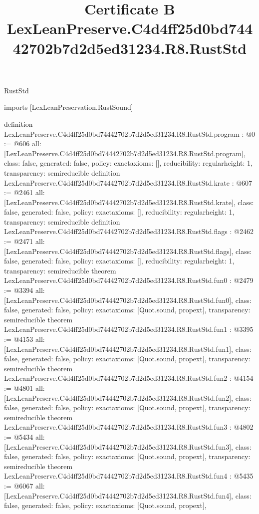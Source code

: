 \begin{lexlean}{RustStd}
\title{Certificate B LexLeanPreserve.C4d4ff25d0bd74442702b7d2d5ed31234.R8.RustStd}
\begin{coremodule}
imports [LexLeanPreservation.RustSound]

definition LexLeanPreserve.C4d4ff25d0bd74442702b7d2d5ed31234.R8.RustStd.program : @0 := @606 {
  all: [LexLeanPreserve.C4d4ff25d0bd74442702b7d2d5ed31234.R8.RustStd.program],
  class: false,
  generated: false,
  policy: exact{axioms: []},
  reducibility: regular{height: 1},
  transparency: semireducible
}
definition LexLeanPreserve.C4d4ff25d0bd74442702b7d2d5ed31234.R8.RustStd.krate : @607 := @2461 {
  all: [LexLeanPreserve.C4d4ff25d0bd74442702b7d2d5ed31234.R8.RustStd.krate],
  class: false,
  generated: false,
  policy: exact{axioms: []},
  reducibility: regular{height: 1},
  transparency: semireducible
}
definition LexLeanPreserve.C4d4ff25d0bd74442702b7d2d5ed31234.R8.RustStd.flags : @2462 := @2471 {
  all: [LexLeanPreserve.C4d4ff25d0bd74442702b7d2d5ed31234.R8.RustStd.flags],
  class: false,
  generated: false,
  policy: exact{axioms: []},
  reducibility: regular{height: 1},
  transparency: semireducible
}
theorem LexLeanPreserve.C4d4ff25d0bd74442702b7d2d5ed31234.R8.RustStd.fun0 : @2479 := @3394 {
  all: [LexLeanPreserve.C4d4ff25d0bd74442702b7d2d5ed31234.R8.RustStd.fun0],
  class: false,
  generated: false,
  policy: exact{axioms: [Quot.sound, propext]},
  transparency: semireducible
}
theorem LexLeanPreserve.C4d4ff25d0bd74442702b7d2d5ed31234.R8.RustStd.fun1 : @3395 := @4153 {
  all: [LexLeanPreserve.C4d4ff25d0bd74442702b7d2d5ed31234.R8.RustStd.fun1],
  class: false,
  generated: false,
  policy: exact{axioms: [Quot.sound, propext]},
  transparency: semireducible
}
theorem LexLeanPreserve.C4d4ff25d0bd74442702b7d2d5ed31234.R8.RustStd.fun2 : @4154 := @4801 {
  all: [LexLeanPreserve.C4d4ff25d0bd74442702b7d2d5ed31234.R8.RustStd.fun2],
  class: false,
  generated: false,
  policy: exact{axioms: [Quot.sound, propext]},
  transparency: semireducible
}
theorem LexLeanPreserve.C4d4ff25d0bd74442702b7d2d5ed31234.R8.RustStd.fun3 : @4802 := @5434 {
  all: [LexLeanPreserve.C4d4ff25d0bd74442702b7d2d5ed31234.R8.RustStd.fun3],
  class: false,
  generated: false,
  policy: exact{axioms: [Quot.sound, propext]},
  transparency: semireducible
}
theorem LexLeanPreserve.C4d4ff25d0bd74442702b7d2d5ed31234.R8.RustStd.fun4 : @5435 := @6067 {
  all: [LexLeanPreserve.C4d4ff25d0bd74442702b7d2d5ed31234.R8.RustStd.fun4],
  class: false,
  generated: false,
  policy: exact{axioms: [Quot.sound, propext]},
}
\end{coremodule}
\end{lexlean}
